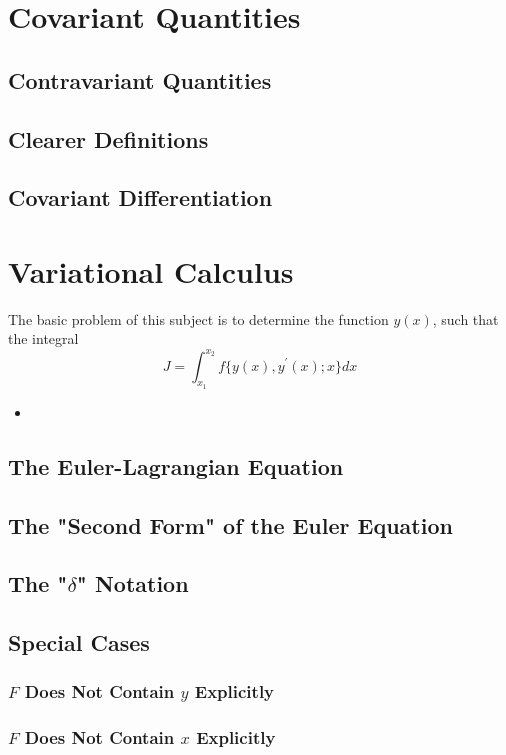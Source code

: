 \section{Covariant Quantities}
\subsection{Contravariant Quantities}
\subsection{Clearer Definitions}
\subsection{Covariant Differentiation}
\section{Variational Calculus}
The basic problem of this subject is to determine the function $y(x)$, such that the integral
\begin{equation}
	J = \int_{x_{1}}^{x_{2}} f\{ y(x),y^{'}(x);x\} dx
\end{equation}
\begin{itemize}
	\item 
\end{itemize}
\subsection{The Euler-Lagrangian Equation}

\subsection{The "Second Form" of the Euler Equation}

\subsection{The "$\delta$" Notation}

\subsection{Special Cases}
\subsubsection{$F$ Does Not Contain $y$ Explicitly}
\subsubsection{$F$ Does Not Contain $x$ Explicitly}
